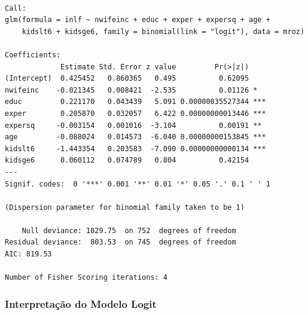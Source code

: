 \documentclass[
  letterpaper,
  DIV=11,
  numbers=noendperiod]{scrartcl}
\begin{document}
\begin{verbatim}

Call:
glm(formula = inlf ~ nwifeinc + educ + exper + expersq + age + 
    kidslt6 + kidsge6, family = binomial(link = "logit"), data = mroz)

Coefficients:
             Estimate Std. Error z value         Pr(>|z|)    
(Intercept)  0.425452   0.860365   0.495          0.62095    
nwifeinc    -0.021345   0.008421  -2.535          0.01126 *  
educ         0.221170   0.043439   5.091 0.00000035527344 ***
exper        0.205870   0.032057   6.422 0.00000000013446 ***
expersq     -0.003154   0.001016  -3.104          0.00191 ** 
age         -0.088024   0.014573  -6.040 0.00000000153845 ***
kidslt6     -1.443354   0.203583  -7.090 0.00000000000134 ***
kidsge6      0.060112   0.074789   0.804          0.42154    
---
Signif. codes:  0 '***' 0.001 '**' 0.01 '*' 0.05 '.' 0.1 ' ' 1

(Dispersion parameter for binomial family taken to be 1)

    Null deviance: 1029.75  on 752  degrees of freedom
Residual deviance:  803.53  on 745  degrees of freedom
AIC: 819.53

Number of Fisher Scoring iterations: 4
\end{verbatim}

\subsubsection{Interpretação do Modelo
Logit}\label{interpretauxe7uxe3o-do-modelo-logit}
\end{document}
